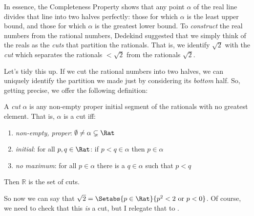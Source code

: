 \documentclass[../../../include/open-logic-section]{subfiles}
\begin{document}
	
In essence, the Completeness Property shows that any point $\alpha$ of the real line divides that line into two halves perfectly: those for which $\alpha$ is the least upper bound, and those for which $\alpha$ is the greatest lower bound. To \emph{construct} the real numbers from the rational numbers, Dedekind suggested that we simply think of the reals as the \emph{cuts} that partition the rationals. That is, we identify $\sqrt{2}$ with the \emph{cut} which separates the rationals $< \sqrt{2}$ from the rationals $ \sqrt{2}$. 

Let's tidy this up. If we cut the rational numbers into two halves, we can uniquely identify the partition we made just by considering its \emph{bottom} half. So, getting precise, we offer the following definition:
\begin{defn}[Cut] A \emph{cut} $\alpha$ is any non-empty proper initial segment of the rationals with no greatest element. That is, $\alpha$ is a cut iff:
	\begin{enumerate}
		\item \emph{non-empty, proper}: $\emptyset \neq \alpha \subsetneq \Rat$
		\item \emph{initial}: for all $p,q \in \Rat$: if $p < q \in \alpha$ then $p \in \alpha$
		\item \emph{no maximum}: for all $p \in \alpha$ there is a $q \in \alpha$ such that $p < q$ 
	\end{enumerate} 
Then $\mathbb{R}$ is the set of cuts. 
\end{defn}\noindent 
So now we can say that $\sqrt{2} = \Setabs{p \in \Rat}{p^2 < 2\text{ or }p < 0}$. Of course, we need to check that this \emph{is} a cut, but I relegate that to .
\end{document}
